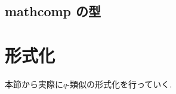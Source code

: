 \documentclass[11pt]{jsreport}
\theoremstyle{mystyle}
\newcommand{\0}{\textbf{0}}
\newcommand{\1}{\textbf{1}}
\newcommand{\2}{\textbf{2}}
\begin{document}
\subsection{mathcomp の型}
%
%
%
\section{形式化}\label{sec form}
本節から実際に$q$-類似の形式化を行っていく. 
\end{document}
